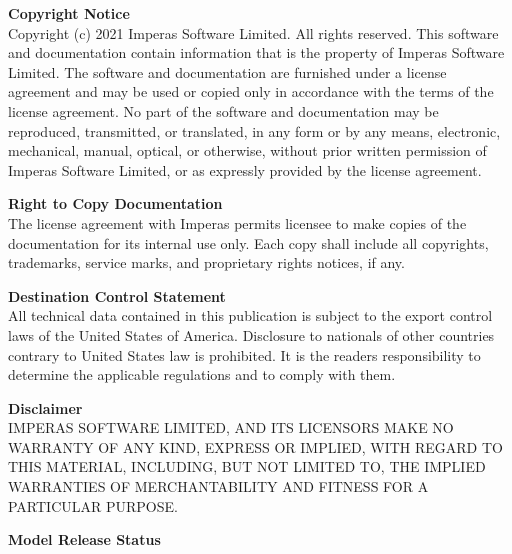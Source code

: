 \begin{titlepage}
\begin{table}[hbt]
\begin{tabular}{|l|l|}
  \end{tabular}
\end{table}
\newpage
\setlength{\parskip}{10pt}
	\raggedright
	{\Large\bfseries Copyright Notice}\\
	{Copyright (c) 2021 Imperas Software Limited. All rights reserved. This software and documentation contain information that is the property of Imperas Software Limited. The software and documentation are furnished under a license agreement and may be used or copied only in accordance with the terms of the license agreement. No part of the software and documentation may be reproduced, transmitted, or translated, in any form or by any means, electronic, mechanical, manual, optical, or otherwise, without prior written permission of Imperas Software Limited, or as expressly provided by the license agreement.} \par

	{\Large\bfseries Right to Copy Documentation}\\
	{The license agreement with Imperas permits licensee to make copies of the documentation for its internal use only. Each copy shall include all copyrights, trademarks, service marks, and proprietary rights notices, if any.} \par
	
	{\Large\bfseries Destination Control Statement}\\
	{All technical data contained in this publication is subject to the export control laws of the United States of America. Disclosure to nationals of other countries contrary to United States law is prohibited. It is the readers responsibility to determine the applicable regulations and to comply with them.} \par
	
	{\Large\bfseries Disclaimer}\\
	{IMPERAS SOFTWARE LIMITED, AND ITS LICENSORS MAKE NO WARRANTY OF ANY KIND, EXPRESS OR IMPLIED, WITH REGARD TO THIS MATERIAL, INCLUDING, BUT NOT LIMITED TO, THE IMPLIED WARRANTIES OF MERCHANTABILITY AND FITNESS FOR A PARTICULAR PURPOSE.} \par
	
	{\Large\bfseries Model Release Status}\\
	{\modelreleasestatusA} \par
\end{titlepage}
\setlength{\parskip}{0pt}

\setcounter{tocdepth}{4}
\setcounter{secnumdepth}{4}
\tableofcontents

\mainmatter
